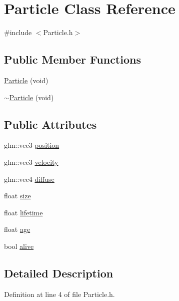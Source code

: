 \hypertarget{class_particle}{\section{Particle Class Reference}
\label{class_particle}
}


{\ttfamily \#include $<$Particle.\-h$>$}

\subsection*{Public Member Functions}
\begin{DoxyCompactItemize}
\item 
\hyperlink{class_particle_a89fff65ae37da07ca215b117e88f12aa}{Particle} (void)
\item 
\hyperlink{class_particle_aedbe5e541966e7799022665fdcb6ba66}{$\sim$\-Particle} (void)
\end{DoxyCompactItemize}
\subsection*{Public Attributes}
\begin{DoxyCompactItemize}
\item 
glm\-::vec3 \hyperlink{class_particle_a779213904ef79ca56e740a01fbb369bf}{position}
\item 
glm\-::vec3 \hyperlink{class_particle_ad29958c8e765528930f7694a0a819c04}{velocity}
\item 
glm\-::vec4 \hyperlink{class_particle_a59d1544a74c8c69b3d374987b5dc095c}{diffuse}
\item 
float \hyperlink{class_particle_aad08a7cb8108751b7a49ed65118873f9}{size}
\item 
float \hyperlink{class_particle_a79e332f17a1b96210a5ae3ce99f68c99}{lifetime}
\item 
float \hyperlink{class_particle_a485c5465eaf42fe44adb9599f58ce0a1}{age}
\item 
bool \hyperlink{class_particle_affebffa1e11f05041c9c46e8b684275b}{alive}
\end{DoxyCompactItemize}


\subsection{Detailed Description}


Definition at line 4 of file Particle.\-h.



